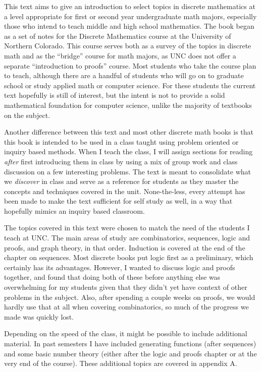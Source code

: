 \documentclass[10pt,]{book}
\theoremstyle{plain}
\theoremstyle{definition}
\theoremstyle{definition}
\theoremstyle{definition}
\numberwithin{equation}{chapter}
\begin{document}
This text aims to give an introduction to select topics in discrete mathematics at a level appropriate for first or second year undergraduate math majors, especially those who intend to teach middle and high school mathematics. The book began as a set of notes for the Discrete Mathematics course at the University of Northern Colorado. This course serves both as a survey of the topics in discrete math and as the ``bridge'' course for math majors, as UNC does not offer a separate ``introduction to proofs'' course. Most students who take the course plan to teach, although there are a handful of students who will go on to graduate school or study applied math or computer science. For these students the current text hopefully is still of interest, but the intent is not to provide a solid mathematical foundation for computer science, unlike the majority of textbooks on the subject.
%
\par

Another difference between this text and most other discrete math books is that this book is intended to be used in a class taught using problem oriented or inquiry based methods. When I teach the class, I will assign sections for reading \emph{after} first introducing them in class by using a mix of group work and class discussion on a few interesting problems. The text is meant to consolidate what we \emph{discover} in class and serve as a reference for students as they master the concepts and techniques covered in the unit. None-the-less, every attempt has been made to make the text sufficient for self study as well, in a way that hopefully mimics an inquiry based classroom.
%
\par

The topics covered in this text were chosen to match the need of the students I teach at UNC. The main areas of study are combinatorics, sequences, logic and proofs, and graph theory, in that order. Induction is covered at the end of the chapter on sequences. Most discrete books put logic first as a preliminary, which certainly has its advantages. However, I wanted to discuss logic and proofs together, and found that doing both of these before anything else was overwhelming for my students given that they didn't yet have context of other problems in the subject. Also, after spending a couple weeks on proofs, we would hardly use that at all when covering combinatorics, so much of the progress we made was quickly lost.
%
\par

Depending on the speed of the class, it might be possible to include additional material. In past semesters I have included generating functions (after sequences) and some basic number theory (either after the logic and proofs chapter or at the very end of the course). These additional topics are covered in appendix A.
%
\par
\end{document}
